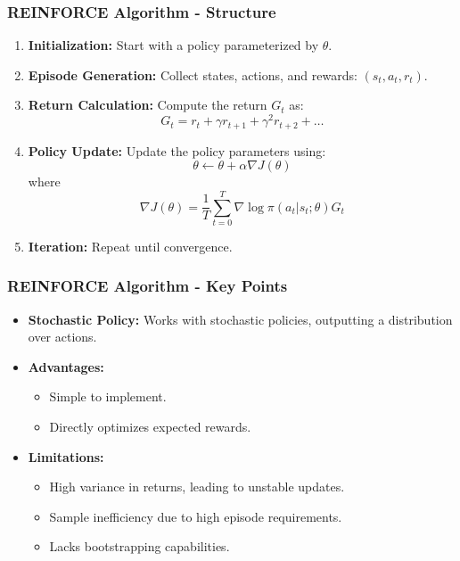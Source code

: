 \documentclass[aspectratio=169]{beamer}
\begin{document}
\begin{frame}[fragile]
    \frametitle{REINFORCE Algorithm - Structure}
    \begin{enumerate}
        \item \textbf{Initialization:} Start with a policy parameterized by $\theta$.
        \item \textbf{Episode Generation:} Collect states, actions, and rewards: $(s_t, a_t, r_t)$.
        \item \textbf{Return Calculation:} Compute the return $G_t$ as:
        \begin{equation}
            G_t = r_t + \gamma r_{t+1} + \gamma^2 r_{t+2} + \ldots
        \end{equation}
        \item \textbf{Policy Update:} Update the policy parameters using:
        \begin{equation}
            \theta \leftarrow \theta + \alpha \nabla J(\theta)
        \end{equation}
        where 
        \begin{equation}
            \nabla J(\theta) = \frac{1}{T} \sum_{t=0}^{T} \nabla \log \pi(a_t | s_t; \theta) G_t
        \end{equation}
        \item \textbf{Iteration:} Repeat until convergence.
    \end{enumerate}
\end{frame}

\begin{frame}[fragile]
    \frametitle{REINFORCE Algorithm - Key Points}
    \begin{itemize}
        \item \textbf{Stochastic Policy:} Works with stochastic policies, outputting a distribution over actions.
        \item \textbf{Advantages:}
        \begin{itemize}
            \item Simple to implement.
            \item Directly optimizes expected rewards.
        \end{itemize}
        \item \textbf{Limitations:}
        \begin{itemize}
            \item High variance in returns, leading to unstable updates.
            \item Sample inefficiency due to high episode requirements.
            \item Lacks bootstrapping capabilities.
        \end{itemize}
    \end{itemize}
\end{frame}
\end{document}
